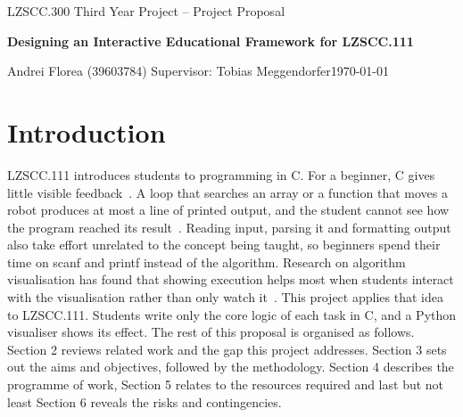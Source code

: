 \documentclass[11pt,a4paper]{article}
\newcommand{\projecttitle}{Designing an Interactive Educational Framework for LZSCC.111}
\newcommand{\studentname}{Andrei Florea}
\newcommand{\studentid}{39603784}
\newcommand{\supervisor}{Tobias Meggendorfer}
\begin{document}
\begin{center}
	{\small LZSCC.300 Third Year Project -- Project Proposal}\par\medskip
	{\LARGE\bfseries \projecttitle\par}\medskip
	\studentname{} (\studentid) \quad\textbullet\quad Supervisor: \supervisor \quad\textbullet\quad \today
\end{center}

\begin{abstract}
	{Students on LZSCC.111 Software Development learn to program in C, where program state is hidden and mistakes often show up only as a wrong number or a crash. This project will build a framework of interactive C exercises that increase in difficulty. In each exercise the student implements a single function. Provided scaffolding handles input and output, and a Python visualiser shows what the code does step by step, such as the bars of an array being searched or a robot moving through a maze. Student code runs inside a C harness that records each step as an event trace and catches crashes, infinite loops and out-of-bounds access. The framework will be evaluated technically and through a small study with students, comparing the exercises with and without the visualiser. The expected outcome is a reusable set of tasks for LZSCC.111, along with indicative evidence on whether visual feedback improves novice understanding and engagement.}
\end{abstract}

\section{Introduction}\label{sec:introduction}

LZSCC.111 introduces students to programming in C. For a beginner, C gives little visible feedback~\cite{smith2000efficacy}. A loop that searches an array or a function that moves a robot produces at most a line of printed output, and the student cannot see how the program reached its result~\cite{fincher2020notional}. Reading input, parsing it and formatting output also take effort unrelated to the concept being taught, so beginners spend their time on scanf and printf instead of the algorithm. Research on algorithm visualisation has found that showing execution helps most when students interact with the visualisation rather than only watch it~\cite{hundhausen2002meta, naps2002exploring}. This project applies that idea to LZSCC.111. Students write only the core logic of each task in C, and a Python visualiser shows its effect.
The rest of this proposal is organised as follows. Section 2 reviews related work and the gap this project addresses. Section 3 sets out the aims and objectives, followed by the methodology. Section 4 describes the programme of work, Section 5 relates to the resources required and last but not least Section 6 reveals the risks and contingencies.
\end{document}
